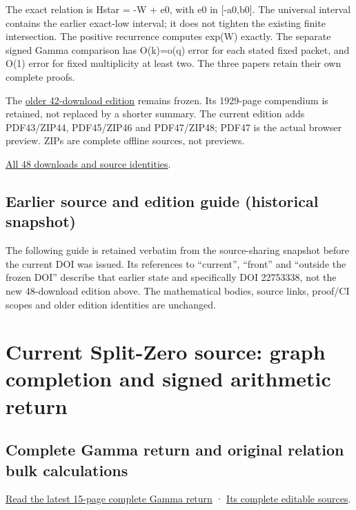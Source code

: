 \documentclass[
]{article}
\begin{document}
The exact relation is Hstar = -W + e0, with e0 in {[}-a0,b0{]}. The
universal interval contains the earlier exact-low interval; it does not
tighten the existing finite intersection. The positive recurrence
computes exp(W) exactly. The separate signed Gamma comparison has
O(k)=o(q) error for each stated fixed packet, and O(1) error for fixed
multiplicity at least two. The three papers retain their own complete
proofs.

The \href{https://doi.org/10.5281/zenodo.22753338}{older 42-download
edition} remains frozen. Its 1929-page compendium is retained, not
replaced by a shorter summary. The current edition adds PDF43/ZIP44,
PDF45/ZIP46 and PDF47/ZIP48; PDF47 is the actual browser preview. ZIPs
are complete offline sources, not previews.

\href{calculation_edition_20260914_gamma_return/README.md}{All 48
downloads and source identities}.

\subsection{Earlier source and edition guide (historical
snapshot)}\label{earlier-source-and-edition-guide-historical-snapshot-21}

The following guide is retained verbatim from the source-sharing
snapshot before the current DOI was issued. Its references to
``current'', ``front'' and ``outside the frozen DOI'' describe that
earlier state and specifically DOI 22753338, not the new 48-download
edition above. The mathematical bodies, source links, proof/CI scopes
and older edition identities are unchanged.

\section{Current Split-Zero source: graph completion and signed
arithmetic
return}\label{current-split-zero-source-graph-completion-and-signed-arithmetic-return}

\subsection{Complete Gamma return and original relation bulk
calculations}\label{complete-gamma-return-and-original-relation-bulk-calculations}

\href{workbenches/splitzero-tandem/continuations/20260914-complete-gamma-return/Complete_Gamma_Return.pdf}{Read
the latest 15-page complete Gamma return} ·
\href{workbenches/splitzero-tandem/continuations/20260914-complete-gamma-return/README.md}{Its
complete editable sources}.
\end{document}
